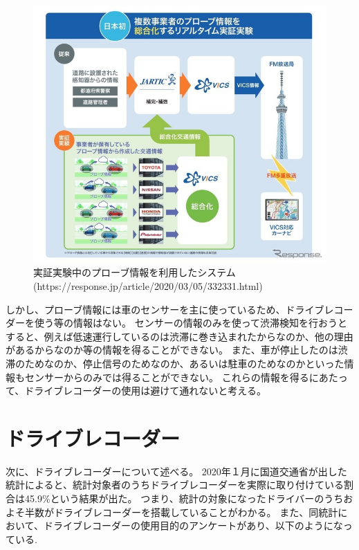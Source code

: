\begin{figure}[htbp]
  \begin{center}
   \includegraphics{figs/probe.jpg}
  \end{center}
  \caption{実証実験中のプローブ情報を利用したシステム(https://response.jp/article/2020/03/05/332331.html)}
  \label{fig:probe}
\end{figure}
\newpage
しかし、プローブ情報には車のセンサーを主に使っているため、ドライブレコーダーを使う等の情報はない。
センサーの情報のみを使って渋滞検知を行おうとすると、例えば低速運行しているのは渋滞に巻き込まれたからなのか、他の理由があるからなのか等の情報を得ることができない。
また、車が停止したのは渋滞のためなのか、停止信号のためなのか、あるいは駐車のためなのかといった情報もセンサーからのみでは得ることができない。
これらの情報を得るにあたって、ドライブレコーダーの使用は避けて通れないと考える。


\section{ドライブレコーダー}
次に、ドライブレコーダーについて述べる。
2020年１月に国道交通省が出した統計によると、統計対象者のうちドライブレコーダーを実際に取り付けている割合は45.9\%という結果が出た。
つまり、統計の対象になったドライバーのうちおよそ半数がドライブレコーダーを搭載していることがわかる。
また、同統計において、ドライブレコーダーの使用目的のアンケートがあり、以下のようになっている.

